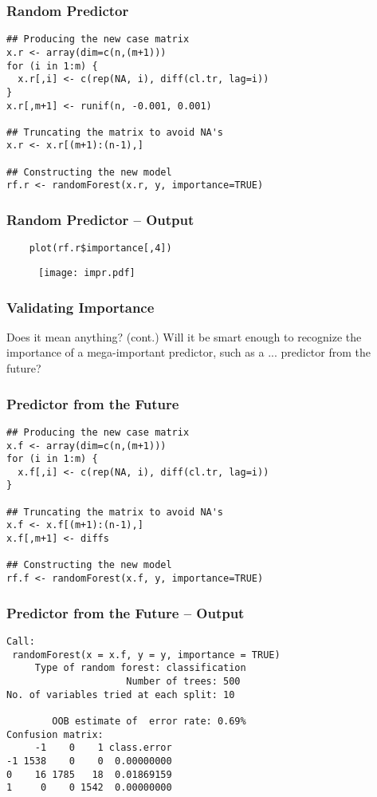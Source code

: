 \documentclass[utf8]{beamer}
\theoremstyle{definition}
\theoremstyle{remark}
\begin{document}
\begin{frame}[fragile]
  \frametitle{Random Predictor}
    \begin{lstlisting}
## Producing the new case matrix
x.r <- array(dim=c(n,(m+1)))
for (i in 1:m) {
  x.r[,i] <- c(rep(NA, i), diff(cl.tr, lag=i))
}
x.r[,m+1] <- runif(n, -0.001, 0.001)

## Truncating the matrix to avoid NA's
x.r <- x.r[(m+1):(n-1),]

## Constructing the new model
rf.r <- randomForest(x.r, y, importance=TRUE)
    \end{lstlisting}
\end{frame}

\begin{frame}[fragile]
  \frametitle{Random Predictor -- Output}
    \begin{lstlisting}
    plot(rf.r$importance[,4])
    \end{lstlisting}
    \begin{figure}
      \centering
      \texttt{[image: impr.pdf]}
      \label{fig:digraph}
    \end{figure}
\end{frame}

\begin{frame}[fragile]
  \frametitle{Validating Importance}
  \begin{block}{Does it mean anything? (cont.)}
    Will it be smart enough to recognize the importance of a mega-important
    predictor, such as a ... predictor from the future?
  \end{block}
\end{frame}

\begin{frame}[fragile]
  \frametitle{Predictor from the Future}
    \begin{lstlisting}
## Producing the new case matrix
x.f <- array(dim=c(n,(m+1)))
for (i in 1:m) {
  x.f[,i] <- c(rep(NA, i), diff(cl.tr, lag=i))
}

## Truncating the matrix to avoid NA's
x.f <- x.f[(m+1):(n-1),]
x.f[,m+1] <- diffs

## Constructing the new model
rf.f <- randomForest(x.f, y, importance=TRUE)
    \end{lstlisting}
\end{frame}

\begin{frame}[fragile]
  \frametitle{Predictor from the Future -- Output}
    \begin{lstlisting}
Call:
 randomForest(x = x.f, y = y, importance = TRUE) 
     Type of random forest: classification
                     Number of trees: 500
No. of variables tried at each split: 10

        OOB estimate of  error rate: 0.69%
Confusion matrix:
     -1    0    1 class.error
-1 1538    0    0  0.00000000
0    16 1785   18  0.01869159
1     0    0 1542  0.00000000
    \end{lstlisting}
\end{frame}
\end{document}
